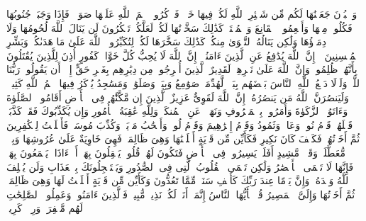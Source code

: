 \stopbuffer
\startbuffer[\q:22:36]
وَٱلۡبُدۡنَ جَعَلۡنَٰهَا لَكُم مِّن شَعَٰۤئِرِ ٱللَّهِ لَكُمۡ فِیهَا خَیۡرࣱۖ فَٱذۡكُرُوا۟ ٱسۡمَ ٱللَّهِ عَلَیۡهَا صَوَاۤفَّۖ فَإِذَا وَجَبَتۡ جُنُوبُهَا فَكُلُوا۟ مِنۡهَا وَأَطۡعِمُوا۟ ٱلۡقَانِعَ وَٱلۡمُعۡتَرَّۚ كَذَٰلِكَ سَخَّرۡنَٰهَا لَكُمۡ لَعَلَّكُمۡ تَشۡكُرُونَ%
\stopbuffer
\startbuffer[\q:22:37]
لَن یَنَالَ ٱللَّهَ لُحُومُهَا وَلَا دِمَاۤؤُهَا وَلَٰكِن یَنَالُهُ ٱلتَّقۡوَىٰ مِنكُمۡۚ كَذَٰلِكَ سَخَّرَهَا لَكُمۡ لِتُكَبِّرُوا۟ ٱللَّهَ عَلَىٰ مَا هَدَىٰكُمۡۗ وَبَشِّرِ ٱلۡمُحۡسِنِینَ%
\stopbuffer
\startbuffer[\q:22:38]
۞ إِنَّ ٱللَّهَ یُدَٰفِعُ عَنِ ٱلَّذِینَ ءَامَنُوۤا۟ۗ إِنَّ ٱللَّهَ لَا یُحِبُّ كُلَّ خَوَّانࣲ كَفُورٍ%
\stopbuffer
\startbuffer[\q:22:39]
أُذِنَ لِلَّذِینَ یُقَٰتَلُونَ بِأَنَّهُمۡ ظُلِمُوا۟ۚ وَإِنَّ ٱللَّهَ عَلَىٰ نَصۡرِهِمۡ لَقَدِیرٌ%
\stopbuffer
\startbuffer[\q:22:40]
ٱلَّذِینَ أُخۡرِجُوا۟ مِن دِیَٰرِهِم بِغَیۡرِ حَقٍّ إِلَّاۤ أَن یَقُولُوا۟ رَبُّنَا ٱللَّهُۗ وَلَوۡلَا دَفۡعُ ٱللَّهِ ٱلنَّاسَ بَعۡضَهُم بِبَعۡضࣲ لَّهُدِّمَتۡ صَوَٰمِعُ وَبِیَعࣱ وَصَلَوَٰتࣱ وَمَسَٰجِدُ یُذۡكَرُ فِیهَا ٱسۡمُ ٱللَّهِ كَثِیرࣰاۗ وَلَیَنصُرَنَّ ٱللَّهُ مَن یَنصُرُهُۥۤۚ إِنَّ ٱللَّهَ لَقَوِیٌّ عَزِیزٌ%
\stopbuffer
\startbuffer[\q:22:41]
ٱلَّذِینَ إِن مَّكَّنَّٰهُمۡ فِی ٱلۡأَرۡضِ أَقَامُوا۟ ٱلصَّلَوٰةَ وَءَاتَوُا۟ ٱلزَّكَوٰةَ وَأَمَرُوا۟ بِٱلۡمَعۡرُوفِ وَنَهَوۡا۟ عَنِ ٱلۡمُنكَرِۗ وَلِلَّهِ عَٰقِبَةُ ٱلۡأُمُورِ%
\stopbuffer
\startbuffer[\q:22:42]
وَإِن یُكَذِّبُوكَ فَقَدۡ كَذَّبَتۡ قَبۡلَهُمۡ قَوۡمُ نُوحࣲ وَعَادࣱ وَثَمُودُ%
\stopbuffer
\startbuffer[\q:22:43]
وَقَوۡمُ إِبۡرَٰهِیمَ وَقَوۡمُ لُوطࣲ%
\stopbuffer
\startbuffer[\q:22:44]
وَأَصۡحَٰبُ مَدۡیَنَۖ وَكُذِّبَ مُوسَىٰۖ فَأَمۡلَیۡتُ لِلۡكَٰفِرِینَ ثُمَّ أَخَذۡتُهُمۡۖ فَكَیۡفَ كَانَ نَكِیرِ%
\stopbuffer
\startbuffer[\q:22:45]
فَكَأَیِّن مِّن قَرۡیَةٍ أَهۡلَكۡنَٰهَا وَهِیَ ظَالِمَةࣱ فَهِیَ خَاوِیَةٌ عَلَىٰ عُرُوشِهَا وَبِئۡرࣲ مُّعَطَّلَةࣲ وَقَصۡرࣲ مَّشِیدٍ%
\stopbuffer
\startbuffer[\q:22:46]
أَفَلَمۡ یَسِیرُوا۟ فِی ٱلۡأَرۡضِ فَتَكُونَ لَهُمۡ قُلُوبࣱ یَعۡقِلُونَ بِهَاۤ أَوۡ ءَاذَانࣱ یَسۡمَعُونَ بِهَاۖ فَإِنَّهَا لَا تَعۡمَى ٱلۡأَبۡصَٰرُ وَلَٰكِن تَعۡمَى ٱلۡقُلُوبُ ٱلَّتِی فِی ٱلصُّدُورِ%
\stopbuffer
\startbuffer[\q:22:47]
وَیَسۡتَعۡجِلُونَكَ بِٱلۡعَذَابِ وَلَن یُخۡلِفَ ٱللَّهُ وَعۡدَهُۥۚ وَإِنَّ یَوۡمًا عِندَ رَبِّكَ كَأَلۡفِ سَنَةࣲ مِّمَّا تَعُدُّونَ%
\stopbuffer
\startbuffer[\q:22:48]
وَكَأَیِّن مِّن قَرۡیَةٍ أَمۡلَیۡتُ لَهَا وَهِیَ ظَالِمَةࣱ ثُمَّ أَخَذۡتُهَا وَإِلَیَّ ٱلۡمَصِیرُ%
\stopbuffer
\startbuffer[\q:22:49]
قُلۡ یَٰۤأَیُّهَا ٱلنَّاسُ إِنَّمَاۤ أَنَا۠ لَكُمۡ نَذِیرࣱ مُّبِینࣱ%
\stopbuffer
\startbuffer[\q:22:50]
فَٱلَّذِینَ ءَامَنُوا۟ وَعَمِلُوا۟ ٱلصَّٰلِحَٰتِ لَهُم مَّغۡفِرَةࣱ وَرِزۡقࣱ كَرِیمࣱ%
